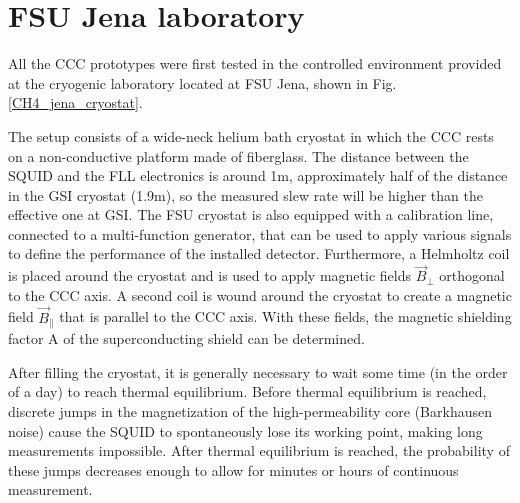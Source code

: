 \documentclass[12pt,a4paper]{report}
\begin{document}
       \section{FSU Jena laboratory}
       All the CCC prototypes were first tested in the controlled environment provided at the cryogenic laboratory located at FSU Jena, shown in Fig.\ref{CH4_jena_cryostat}.
     
       The setup consists of a wide-neck helium bath cryostat in which the CCC rests on a non-conductive platform made of fiberglass. The distance between the SQUID and the FLL electronics is around 1m, approximately half of the distance in the GSI cryostat (1.9m), so the measured slew rate will be higher than the effective one at GSI. The FSU cryostat is also equipped with a calibration line, connected to a multi-function generator, that can be used to apply various signals to define the performance of the installed detector. Furthermore, a Helmholtz coil is placed around the cryostat and is used to apply magnetic fields $\overrightarrow{B}_\bot$ orthogonal to the CCC axis. A second coil is wound around the cryostat to create a magnetic field $\overrightarrow{B}_\|$ that is parallel to the CCC axis. With these fields, the magnetic shielding factor A of the superconducting shield can be determined.
       
       After filling the cryostat, it is generally necessary to wait some time (in the order of a day) to reach thermal equilibrium. Before thermal equilibrium is reached, discrete jumps in the magnetization of the high-permeability core (Barkhausen noise) cause the SQUID to spontaneously lose its working point, making long measurements impossible. After thermal equilibrium is reached, the probability of these jumps decreases enough to allow for minutes or hours of continuous measurement.
       
\end{document}
